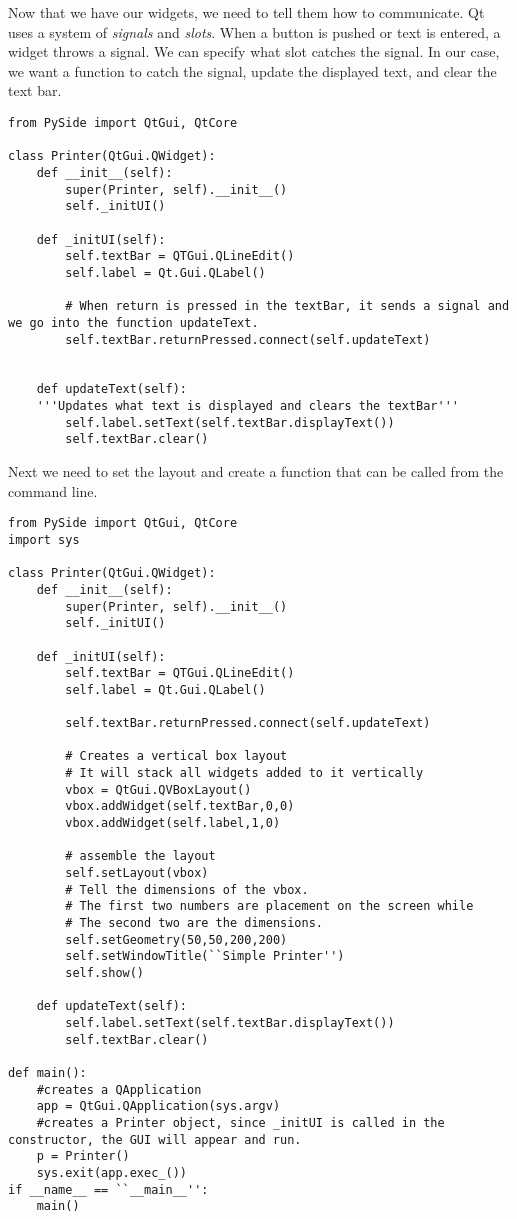 Now that we have our widgets, we need to tell them how to communicate.
Qt uses a system of \emph{signals} and \emph{slots}.
When a button is pushed or text is entered, a widget throws a signal.
We can specify what slot catches the signal.
In our case, we want a function to catch the signal, update the displayed text, and clear the text bar.

\begin{lstlisting}
from PySide import QtGui, QtCore

class Printer(QtGui.QWidget):
	def __init__(self):
		super(Printer, self).__init__() 
		self._initUI()

	def _initUI(self): 
		self.textBar = QTGui.QLineEdit()
		self.label = Qt.Gui.QLabel()
		
		# When return is pressed in the textBar, it sends a signal and we go into the function updateText.
		self.textBar.returnPressed.connect(self.updateText)
	
		
	def updateText(self):
	'''Updates what text is displayed and clears the textBar'''
		self.label.setText(self.textBar.displayText())
		self.textBar.clear()

\end{lstlisting}

Next we need to set the layout and create a function that can be called from the command line.

\begin{lstlisting}
from PySide import QtGui, QtCore
import sys

class Printer(QtGui.QWidget):
	def __init__(self):
		super(Printer, self).__init__() 
		self._initUI()

	def _initUI(self): 
		self.textBar = QTGui.QLineEdit()
		self.label = Qt.Gui.QLabel()
		
		self.textBar.returnPressed.connect(self.updateText)
	
		# Creates a vertical box layout
		# It will stack all widgets added to it vertically
		vbox = QtGui.QVBoxLayout()
		vbox.addWidget(self.textBar,0,0)
		vbox.addWidget(self.label,1,0)
		
		# assemble the layout
		self.setLayout(vbox)
		# Tell the dimensions of the vbox.
		# The first two numbers are placement on the screen while
		# The second two are the dimensions.
		self.setGeometry(50,50,200,200)
		self.setWindowTitle(``Simple Printer'')
		self.show()
	
	def updateText(self):
		self.label.setText(self.textBar.displayText())
		self.textBar.clear()
		
def main():
	#creates a QApplication
	app = QtGui.QApplication(sys.argv) 
	#creates a Printer object, since _initUI is called in the constructor, the GUI will appear and run.
	p = Printer()
	sys.exit(app.exec_())
if __name__ == ``__main__'':
	main()

\end{lstlisting}

